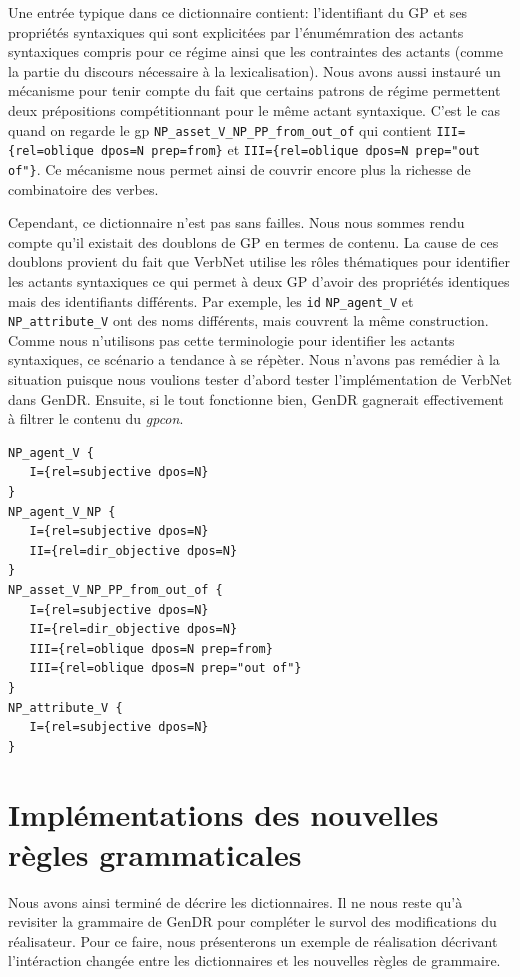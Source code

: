 Une entrée typique dans ce dictionnaire contient: l'identifiant du \ac{GP} et ses propriétés syntaxiques qui sont explicitées par l'énumémration des actants syntaxiques compris pour ce régime ainsi que les contraintes des actants (comme la partie du discours nécessaire à la lexicalisation). Nous avons aussi instauré un mécanisme pour tenir compte du fait que certains patrons de régime permettent deux prépositions compétitionnant pour le même actant syntaxique. C'est le cas quand on regarde le gp \texttt{NP\_asset\_V\_NP\_PP\_from\_out\_of} qui contient \lstinline|III={rel=oblique dpos=N prep=from}| et \lstinline|III={rel=oblique dpos=N prep="out of"}|. Ce mécanisme nous permet ainsi de couvrir encore plus la richesse de combinatoire des verbes.

Cependant, ce dictionnaire n'est pas sans failles. Nous nous sommes rendu compte qu'il existait des doublons de \ac{GP} en termes de contenu. La cause de ces doublons provient du fait que VerbNet utilise les rôles thématiques pour identifier les actants syntaxiques ce qui permet à deux \ac{GP} d'avoir des propriétés identiques mais des identifiants différents. Par exemple, les \texttt{id} \texttt{NP\_agent\_V} et \texttt{NP\_attribute\_V} ont des noms différents, mais couvrent la même construction. Comme nous n'utilisons pas cette terminologie pour identifier les actants syntaxiques,  ce scénario a tendance à se répèter. Nous n'avons pas remédier à la situation puisque nous voulions tester d'abord tester l'implémentation de VerbNet dans GenDR. Ensuite, si le tout fonctionne bien, GenDR gagnerait effectivement à filtrer le contenu du \emph{gpcon}.

\begin{lstlisting}[language=XML, caption = Gpcon]
NP_agent_V {
   I={rel=subjective dpos=N}
}
NP_agent_V_NP {
   I={rel=subjective dpos=N}
   II={rel=dir_objective dpos=N}
}
NP_asset_V_NP_PP_from_out_of {
   I={rel=subjective dpos=N}
   II={rel=dir_objective dpos=N}
   III={rel=oblique dpos=N prep=from}
   III={rel=oblique dpos=N prep="out of"}
}
NP_attribute_V {
   I={rel=subjective dpos=N}
}
\end{lstlisting}

\section{Implémentations des nouvelles règles grammaticales}
Nous avons ainsi terminé de décrire les dictionnaires. Il ne nous reste qu'à revisiter la grammaire de GenDR pour compléter le survol des modifications du réalisateur. Pour ce faire, nous présenterons un exemple de réalisation décrivant l'intéraction changée entre les dictionnaires et les nouvelles règles de grammaire. 

